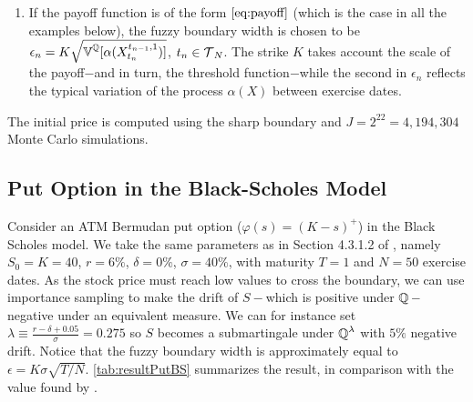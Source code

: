 \begin{enumerate}
    \item %
    If the payoff function is of the form
    $\eqref{eq:payoff}$ (which is the case in all the examples below), the fuzzy boundary width is chosen to be %
    $\epsilon_n = K \sqrt{\operatorname{\mathbb{V}}^{\operatorname{\mathbb{Q}}}[ \alpha(X^{t_{n-1},1}_{t_n})]}$, $t_n \in \operatorname{\mathcal{T}}_N$. 
     The strike $K$ takes account the scale of the payoff$-$and in turn, the threshold function$-$while  the second in $\epsilon_n$ reflects the typical variation %
     of the  process $\alpha(X)$ between exercise dates.  %

\end{enumerate}
The initial price is computed using the sharp boundary and $J= 2^{22} = 4,194,304$ Monte Carlo simulations. 

\subsection{Put Option in the Black-Scholes Model} \label{sec:putBS}
Consider an ATM Bermudan put option ($\varphi(s) = (K-s)^+$) in the Black Scholes model. We take the same parameters as in  Section 4.3.1.2 of \cite{Becker2}, namely
$S_0=K=40$, $r = 6\%$, $\delta = 0\%$, $\sigma = 40\%$, with maturity $T=1$ and  $N=50$ exercise dates. %
As the stock price must reach low values to cross the boundary, we can use importance sampling to make the drift of $S-$which is positive under $\operatorname{\mathbb{Q}}-$negative under an equivalent measure. We can for instance set $\lambda \equiv \frac{r-\delta + 0.05}{\sigma}  = 0.275$ so $S$ becomes a submartingale under $\operatorname{\mathbb{Q}}^{\lambda}$ with $5\%$ negative drift. Notice that the fuzzy boundary width is approximately equal to $\epsilon = K\sigma \sqrt{T/N}$.  \cref{tab:resultPutBS} summarizes the result, in comparison with the value found by \citet{Becker1}. 

